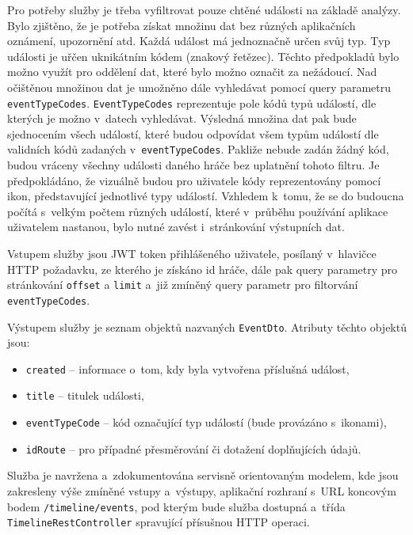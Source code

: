 \documentclass[twoside, 12pt]{article}
\begin{document}
{Pro potřeby služby je třeba vyfiltrovat pouze chtěné události na základě analýzy.
Bylo zjištěno, že je potřeba získat množinu dat bez různých aplikačních oznámení, upozornění atd.
Každá událost má jednoznačně určen svůj typ.
Typ události je uřčen uknikátním kódem (znakový řetězec).
Těchto předpokladů bylo možno využít pro oddělení dat, které bylo možno označit za nežádoucí.
Nad očištěnou množinou dat je umožněno dále vyhledávat pomocí query parametru \texttt{eventTypeCodes}.
\texttt{EventTypeCodes} reprezentuje pole kódů typů událostí, dle kterých je možno v~datech vyhledávat.
Výsledná množina dat pak bude sjednocením všech událostí,
které budou odpovídat všem typům událostí dle validních kódů zadaných v~\texttt{eventTypeCodes}.
Pakliže nebude zadán žádný kód, budou vráceny všechny události daného hráče bez uplatnění tohoto filtru.
Je předpokládáno, že vizuálně budou pro uživatele kódy reprezentovány pomocí ikon,
představující jednotlivé typy událostí.
Vzhledem k~tomu, že se do budoucna počítá s~velkým počtem různých událostí,
které v~průběhu používání aplikace uživatelem nastanou,
bylo nutné zavést i~stránkování výstupních dat.

Vstupem služby jsou JWT token přihlášeného uživatele, posílaný v~hlavičce HTTP požadavku,
ze kterého je získáno id hráče, dále pak query parametry pro stránkování \texttt{offset} a \texttt{limit}
a~již zmíněný query parametr pro filtorvání \texttt{eventTypeCodes}.

Výstupem služby je seznam objektů nazvaných \texttt{EventDto}.
Atributy těchto objektů jsou:
\begin{itemize}
\item \texttt{created} -- informace o~tom, kdy byla vytvořena příslušná událost,
\item \texttt{title} -- titulek události,
\item \texttt{eventTypeCode} -- kód označující typ událostí (bude provázáno s~ikonami),
\item \texttt{idRoute} -- pro případné přesměrování či dotažení doplňujících údajů.
\end{itemize}


Služba je navržena a~zdokumentována servisně orientovaným modelem, kde jsou zakresleny výše zmíněné vstupy a~výstupy,
aplikační rozhraní s~URL koncovým bodem \texttt{/timeline/events},
pod kterým bude služba dostupná
a~třída \texttt{TimelineRestController} spravující přísušnou HTTP operaci.


}
\end{document}
